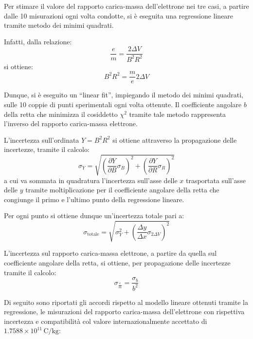 \documentclass[a4paper,12pt]{article}
\begin{document}
Per stimare il valore del rapporto carica-massa dell’elettrone nei tre casi, a partire dalle 10 misurazioni ogni volta condotte, si è eseguita una regressione lineare tramite metodo dei minimi quadrati.

Infatti, dalla relazione:
\begin{equation}
    \frac{e}{m} = \frac{2 \Delta V}{B^2 R^2}
    \label{eq:rapporto_carica_massa}
\end{equation}
si ottiene:
\begin{equation}
    B^2 R^2 = \frac{m}{e} 2 \Delta V
    \label{eq:linear_relation}
\end{equation}

Dunque, si è eseguito un “linear fit”, impiegando il metodo dei minimi quadrati, sulle 10 coppie di punti sperimentali ogni volta ottenute. Il coefficiente angolare \( b \) della retta che minimizza il cosiddetto \( \chi^2 \) tramite tale metodo rappresenta l’inverso del rapporto carica-massa elettrone.

L’incertezza sull’ordinata \( Y = B^2 R^2 \) si ottiene attraverso la propagazione delle incertezze, tramite il calcolo:
\begin{equation}
    \sigma_Y = \sqrt{\left( \frac{\partial Y}{\partial B} \sigma_B \right)^2 + \left( \frac{\partial Y}{\partial R} \sigma_R \right)^2}
    \label{eq:uncertainty_Y}
\end{equation}
a cui va sommata in quadratura l’incertezza sull’asse delle \( x \) trasportata sull’asse delle \( y \) tramite moltiplicazione per il coefficiente angolare della retta che congiunge il primo e l’ultimo punto della regressione lineare.

Per ogni punto si ottiene dunque un’incertezza totale pari a:
\begin{equation}
    \sigma_{\text{totale}} = \sqrt{\sigma_Y^2 + \left( \frac{\Delta y}{\Delta x} \sigma_{2\Delta V} \right)^2}
    \label{eq:total_uncertainty}
\end{equation}

L’incertezza sul rapporto carica-massa elettrone, a partire da quella sul coefficiente angolare della retta, si ottiene, per propagazione delle incertezze tramite il calcolo:
\begin{equation}
    \sigma_{\frac{e}{m}} = \frac{\sigma_b}{b^2}
    \label{eq:uncertainty_em}
\end{equation}

Di seguito sono riportati gli accordi rispetto al modello lineare ottenuti tramite la regressione, le misurazioni del rapporto carica-massa dell’elettrone con rispettiva incertezza e compatibilità col valore internazionalmente accettato di \( 1.7588 \times 10^{11} \, \text{C/kg} \):
\end{document}
